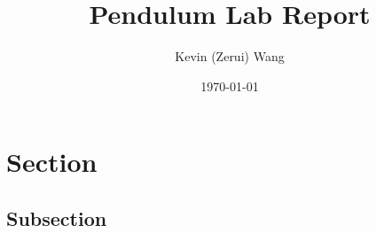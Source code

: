 \documentclass[12pt]{article}
\title{Pendulum Lab Report}
\author{Kevin (Zerui) Wang}
\date{\today}
\begin{document}
\maketitle

\newpage

\section{Section}
\subsection{Subsection}
\end{document}

